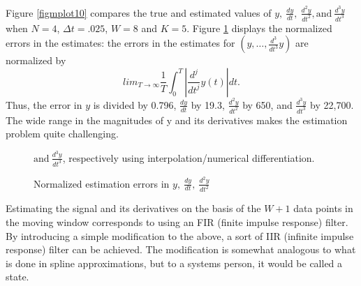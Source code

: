 Figure \ref{figmplot10} compares the true and estimated values of
$y, \ \frac{dy}{dt}, \
\frac{d^2y}{dt^2}, \mbox{and} \
\frac{d^3y}{dt^3}$ when $N=4$, $\Delta t = .025$, $W=8$ and $K=5$. 
Figure \ref{figsineinterp} displays the normalized errors
in the estimates: the errors in the estimates 
for $(y, \ldots, \frac{d^3}{dt^3}y)$ are normalized
by 
\begin{equation}
lim_{T \rightarrow \infty} \frac{1}{T} \int_{0}^{T}{|\frac{d^j}{dt^j}y(t)| dt}.
\label{scales}
\end{equation}
Thus, the error in $y$ is divided by 0.796, $\frac{dy}{dt}$ by 19.3,
$\frac{d^2y}{dt^2}$ by 650, 
and $\frac{d^3y}{dt^3}$ by 22,700.  The wide range in the magnitudes of y
and its derivatives makes the
estimation problem quite challenging.


\begin{figure}[hbt]
\centerline{}
\smallskip
\small
\caption{\small Normalized estimation errors in $y, \ \frac{dy}{dt}, \
\frac{d^2y}{dt^2}$} 
$\mbox{and} \
\frac{d^3y}{dt^3}$, respectively using interpolation/numerical differentiation.
\label{figsineinterp}
\end{figure}


Estimating the signal and its derivatives on the basis of 
the $W + 1$ data points in the moving window corresponds to using
an FIR (finite impulse response) 
filter.  By introducing a simple modification
to the above, a sort of IIR (infinite
impulse response) filter can be achieved.  The modification is somewhat
analogous to 
what is done in spline
approximations, but to a systems person, it would be called a state.

